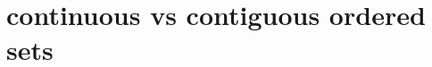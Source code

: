 \documentclass[../main.tex]{subfiles}
\begin{document}
\section{continuous vs contiguous ordered sets}

\pagebreak
\end{document}
